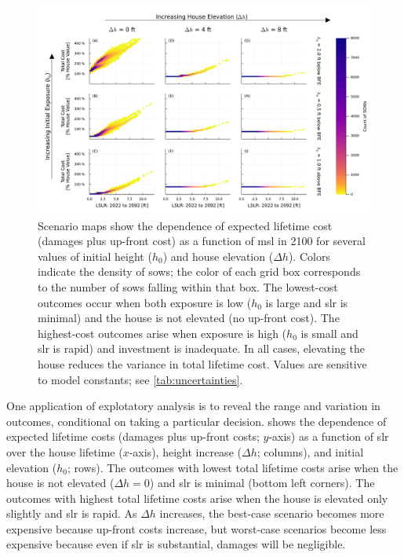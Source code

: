 \documentclass[11pt]{article}
\begin{document}
\begin{figure}
    \includegraphics[width=\textwidth]{scenario-map-slr-cost}
    \caption{
        Scenario maps show the dependence of expected lifetime cost (damages plus up-front cost) as a function of \gls{msl} in 2100 for several values of initial height ($h_0$) and house elevation ($\Delta h$).
        Colors indicate the density of \glspl{sow}; the color of each grid box corresponds to the number of \glspl{sow} falling within that box.
        The lowest-cost outcomes occur when both exposure is low ($h_0$ is large and \gls{slr} is minimal) and the house is not elevated (no up-front cost).
        The highest-cost outcomes arise when exposure is high ($h_0$ is small and \gls{slr} is rapid) and investment is inadequate.
        In all cases, elevating the house reduces the variance in total lifetime cost.
        Values are sensitive to model constants; see \cref{tab:uncertainties}.
    }\label{fig:scenario-map-slr-cost}
\end{figure}

One application of explotatory analysis is to reveal the range and variation in outcomes, conditional on taking a particular decision.
 shows the dependence of expected lifetime costs (damages plus up-front costs; $y$-axis) as a function of  \gls{slr} over the house lifetime ($x$-axis), height increase ($\Delta h$; columns), and initial elevation ($h_0$; rows).
The outcomes with lowest total lifetime costs arise when the house is not elevated ($\Delta h = 0$) and \gls{slr} is minimal (bottom left corners).
The outcomes with highest total lifetime costs arise when the house is elevated only slightly and \gls{slr} is rapid.
As $\Delta h$ increases, the best-case scenario becomes more expensive because up-front costs increase, but worst-case scenarios become less expensive because even if \gls{slr} is substantial, damages will be negligible.
\end{document}
